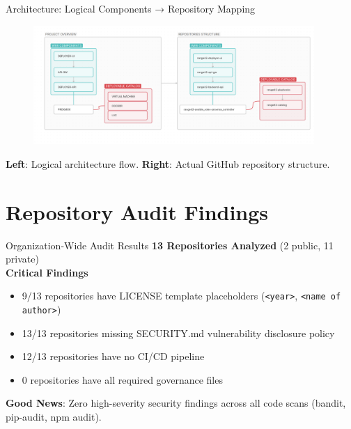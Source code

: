 \documentclass[aspectratio=169]{beamer}
\begin{document}
\begin{frame}{Architecture: Logical Components → Repository Mapping}
  \begin{figure}
    \centering
    \includegraphics[width=0.95\textwidth]{images/diagrams/architecture.png}
  \end{figure}
  \vspace{-2mm}
  \begin{tcolorbox}
    \faInfoCircle\; \textbf{Left}: Logical architecture flow. \textbf{Right}: Actual GitHub repository structure.
  \end{tcolorbox}
\end{frame}

\section{Repository Audit Findings}

\begin{frame}{Organization-Wide Audit Results \; \faClipboardCheck}
  \textbf{13 Repositories Analyzed} (2 public, 11 private)\\[3mm]
  
  \textbf{Critical Findings}
  \begin{itemize}
    \item \alert{9/13 repositories} have LICENSE template placeholders (\texttt{<year>}, \texttt{<name of author>})
    \item \alert{13/13 repositories} missing SECURITY.md vulnerability disclosure policy
    \item \alert{12/13 repositories} have no CI/CD pipeline
    \item \alert{0 repositories} have all required governance files
  \end{itemize}
  \vspace{2mm}
  \begin{tcolorbox}
    \faCheckCircle\; \textbf{Good News}: Zero high-severity security findings across all code scans (bandit, pip-audit, npm audit).
  \end{tcolorbox}
\end{frame}
\end{document}
